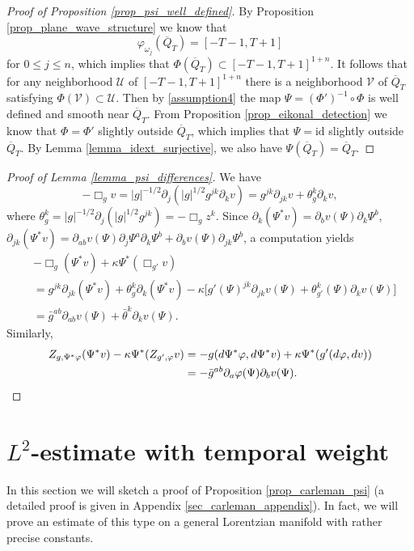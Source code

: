 \documentclass[11pt,letterpaper]{amsart}
\theoremstyle{definition}
\numberwithin{equation}{section}
\newcommand{\ol}[1]{\overline{#1}}
\newcommand{\id}{\mathrm{id}}
\newcommand{\p}{\partial}
\def\p{\partial}
\begin{document}
\begin{proof}[Proof of Proposition \ref{prop_psi_well_defined}]
By Proposition \ref{prop_plane_wave_structure} we know that 
\[
\varphi_{\omega_j}(\ol{Q}_T) = [-T-1,T+1]
\]
for $0 \leq j \leq n$, which implies that $\Phi(\ol{Q}_T) \subset [-T-1,T+1]^{1+n}$. It follows that for any neighborhood $\mathcal U$ of $[-T-1,T+1]^{1+n}$ there is a neighborhood $\mathcal V$ of $\ol{Q}_T$ satisfying $\Phi(\mathcal V) \subset \mathcal U$. Then by \eqref{assumption4} the map $\Psi = (\Phi')^{-1} \circ \Phi$ is well defined and smooth near $\ol{Q}_T$. From Proposition \ref{prop_eikonal_detection} we know that $\Phi = \Phi'$ slightly outside $\ol{Q}_T$, which implies that $\Psi = \id$ slightly outside $\ol{Q}_T$. By Lemma \ref{lemma_idext_surjective}, we also have $\Psi(\ol{Q}_T) = \ol{Q}_T$.
\end{proof}

\begin{proof}[Proof of Lemma \ref{lemma_psi_differences}]
We have 
\[
-\Box_g v = |g|^{-1/2} \p_j (|g|^{1/2} g^{jk} \p_k v) = g^{jk} \p_{jk} v + \theta_g^k \p_k v,
\]
where $\theta_g^k = |g|^{-1/2} \p_j (|g|^{1/2} g^{jk}) = - \Box_g z^k$. Since $\p_k(\Psi^* v) = \p_b v(\Psi) \p_k \Psi^b$, $\p_{jk}(\Psi^* v) = \p_{ab} v(\Psi) \p_j \Psi^a \p_k \Psi^b + \p_b v(\Psi) \p_{jk} \Psi^b$, a computation yields 
\begin{align*}
 &- \Box_g (\Psi^* v)  + \kappa \Psi^* (\Box_{g'} v) \\
 &= g^{jk} \p_{jk}(\Psi^* v) + \theta^k_g \p_k(\Psi^* v) - \kappa \big[g'(\Psi)^{jk} \p_{jk} v(\Psi) + \theta_{g'}^k(\Psi) \p_k v(\Psi) \big] \\
 &= \bar{g}^{ab} \p_{ab} v(\Psi) + \bar{\theta}^k \p_k v(\Psi).
\end{align*}
Similarly, 
\begin{align*}
Z_{g,\Psi^* \varphi}(\Psi^* v) - \kappa \Psi^*( Z_{g',\varphi} v) &= -g(d\Psi^* \varphi, d\Psi^* v) + \kappa \Psi^* ( g'(d\varphi,dv)) \\
 &= -\bar{g}^{ab} \p_a \varphi(\Psi) \p_b v(\Psi). \qedhere
\end{align*}
\end{proof}


\section{\texorpdfstring{$L^2$}{L2}-estimate with temporal weight} \label{sec_carleman}

In this section we will sketch a proof of Proposition \ref{prop_carleman_psi} (a detailed proof is given in Appendix \ref{sec_carleman_appendix}). In fact, we will prove an estimate of this type on a general Lorentzian manifold with rather precise constants.
\end{document}
